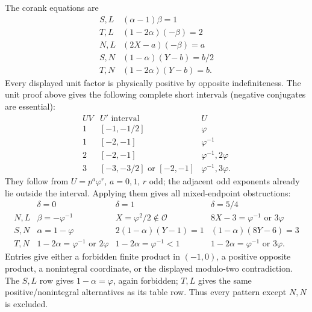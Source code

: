 \documentclass[11pt]{article}
\begin{document}
The corank equations are
\[
\begin{array}{c|l}
S,L&(\alpha-1)\beta=1\\
T,L&(1-2\alpha)(-\beta)=2\\
N,L&(2X-a)(-\beta)=a\\
S,N&(1-\alpha)(Y-b)=b/2\\
T,N&(1-2\alpha)(Y-b)=b.
\end{array}
\]
Every displayed unit factor is physically positive by opposite
indefiniteness. The unit proof above gives the following complete
short intervals (negative conjugates are essential):
\[
\begin{array}{c|c|l}
UV&U'\text{ interval}&U\\ \hline
1&[-1,-1/2]&\varphi\\
1&[-2,-1]&\varphi^{-1}\\
2&[-2,-1]&\varphi^{-1},2\varphi\\
3&[-3,-3/2]\text{ or }[-2,-1]&\varphi^{-1},3\varphi.
\end{array}
\]
They follow from $U=p^a\varphi^r$, $a=0,1$, $r$ odd; the adjacent
odd exponents already lie outside the interval. Applying them gives
all mixed-endpoint obstructions:
\[
\begin{array}{c|ccc}
&\delta=0&\delta=1&\delta=5/4\\ \hline
N,L&\beta=-\varphi^{-1}&X=\varphi^2/2\notin\mathcal O&
 8X-3=\varphi^{-1}\text{ or }3\varphi\\
S,N&\alpha=1-\varphi&2(1-\alpha)(Y-1)=1&
 (1-\alpha)(8Y-6)=3\\
T,N&1-2\alpha=\varphi^{-1}\text{ or }2\varphi&
 1-2\alpha=\varphi^{-1}<1&
 1-2\alpha=\varphi^{-1}\text{ or }3\varphi.
\end{array}
\]
Entries give either a forbidden finite product in $(-1,0)$, a
positive opposite product, a nonintegral coordinate, or the displayed
modulo-two contradiction. The $S,L$ row gives $1-\alpha=\varphi$,
again forbidden; $T,L$ gives the same positive/nonintegral alternatives
as its table row. Thus every pattern except $N,N$ is excluded.
\end{document}
